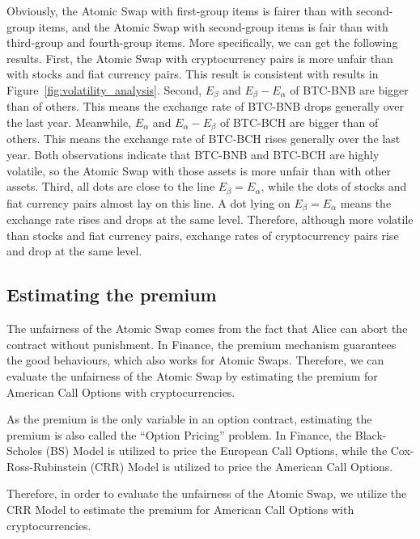 Obviously, the Atomic Swap with first-group items is fairer than with second-group items, and the Atomic Swap with second-group items is fair than with third-group and fourth-group items.
More specifically, we can get the following results.
First, the Atomic Swap with cryptocurrency pairs is more unfair than with stocks and fiat currency pairs.
This result is consistent with results in Figure~\ref{fig:volatility_analysis}.
Second, $E_\beta$ and $E_\beta - E_\alpha$ of BTC-BNB are bigger than of others. This means the exchange rate of BTC-BNB drops generally over the last year.
Meanwhile, $E_\alpha$ and $E_\alpha - E_\beta$ of BTC-BCH are bigger than of others. This means the exchange rate of BTC-BCH rises generally over the last year.
Both observations indicate that BTC-BNB and BTC-BCH are highly volatile, so the Atomic Swap with those assets is more unfair than with other assets.
Third, all dots are close to the line $E_\beta = E_\alpha$, while the dots of stocks and fiat currency pairs almost lay on this line.
A dot lying on $E_\beta = E_\alpha$ means the exchange rate rises and drops at the same level.
Therefore, although more volatile than stocks and fiat currency pairs, exchange rates of cryptocurrency pairs rise and drop at the same level.
















\subsection{Estimating the premium}

The unfairness of the Atomic Swap comes from the fact that Alice can abort the contract without punishment.
In Finance, the premium mechanism guarantees the good behaviours, which also works for Atomic Swaps.
Therefore, we can evaluate the unfairness of the Atomic Swap by estimating the premium for American Call Options with cryptocurrencies.

As the premium is the only variable in an option contract, estimating the premium is also called the ``Option Pricing'' problem.
In Finance, the Black-Scholes (BS) Model is utilized to price the European Call Options,
while the Cox-Ross-Rubinstein (CRR) Model is utilized to price the American Call Options.

Therefore, in order to evaluate the unfairness of the Atomic Swap, we utilize the CRR Model to estimate the premium for American Call Options with cryptocurrencies.

